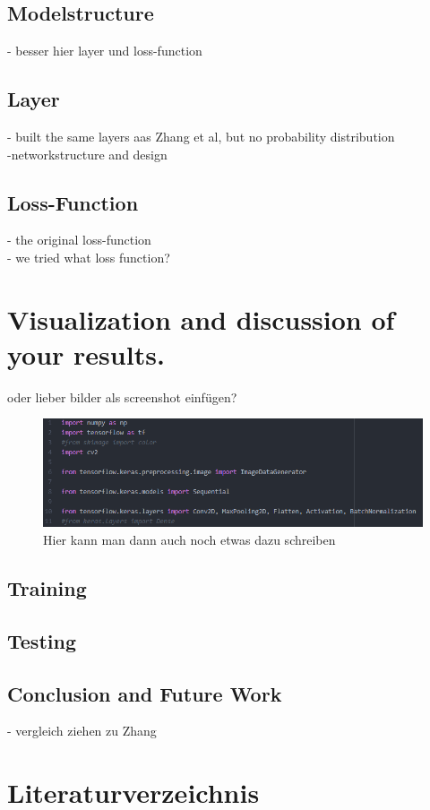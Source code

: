 \documentclass[12pt,letterpaper]{article}
\begin{document}
\subsection{Modelstructure}
- besser hier layer und loss-function
\subsection{Layer}
- built the same layers aas Zhang et al, but no probability distribution\\
-networkstructure and design\\

\subsection{Loss-Function}
- the original loss-function\\
- we tried what loss function?\\
\section{Visualization and discussion of your results.}
oder lieber bilder als screenshot einfügen?\\
\begin{figure}[ht]
	\centering
	\includegraphics[width=1.0\textwidth]{bsp.png}
	\caption{Hier kann man dann auch noch etwas dazu schreiben}
	\label{bsp}
\end{figure}
\subsection{Training}
\subsection{Testing}

\subsection{Conclusion and Future Work}
- vergleich ziehen zu Zhang\\

\section{Literaturverzeichnis}
\label{Lit}

\renewcommand{\bibsection}{}


	
\end{document}
